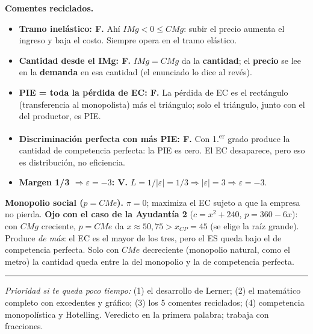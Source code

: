 \documentclass[11pt]{article}
\begin{document}
\textbf{Comentes reciclados.}
\begin{itemize}[leftmargin=*,itemsep=2pt]
\item \textbf{Tramo inelástico: F.} Ahí $IMg < 0 \leq CMg$: subir el precio aumenta el ingreso y baja el costo. Siempre opera en el tramo elástico.
\item \textbf{Cantidad desde el IMg: F.} $IMg = CMg$ da la \textbf{cantidad}; el \textbf{precio} se lee en la \textbf{demanda} en esa cantidad (el enunciado lo dice al revés).
\item \textbf{PIE = toda la pérdida de EC: F.} La pérdida de EC es el rectángulo (transferencia al monopolista) más el triángulo; solo el triángulo, junto con el del productor, es PIE.
\item \textbf{Discriminación perfecta con más PIE: F.} Con 1.\textsuperscript{er} grado produce la cantidad de competencia perfecta: la PIE es cero. El EC desaparece, pero eso es distribución, no eficiencia.
\item \textbf{Margen 1/3 $\Rightarrow \varepsilon = -3$: V.} $L = 1/|\varepsilon| = 1/3 \Rightarrow |\varepsilon| = 3 \Rightarrow \varepsilon = -3$.
\end{itemize}

\textbf{Monopolio social ($p = CMe$).} $\pi = 0$; maximiza el EC sujeto a que la empresa no pierda. \textbf{Ojo con el caso de la Ayudantía 2} ($c = x^{2} + 240$, $p = 360 - 6x$): con $CMg$ creciente, $p = CMe$ da $x \approx 50{,}75 > x_{CP} = 45$ (se elige la raíz grande). Produce \emph{de más}: el EC es el mayor de los tres, pero el ES queda bajo el de competencia perfecta. Solo con $CMe$ decreciente (monopolio natural, como el metro) la cantidad queda entre la del monopolio y la de competencia perfecta.

\medskip
\hrule
\smallskip
{\small\textit{Prioridad si te queda poco tiempo:} (1) el desarrollo de Lerner; (2) el matemático completo con excedentes y gráfico; (3) los 5 comentes reciclados; (4) competencia monopolística y Hotelling. Veredicto en la primera palabra; trabaja con fracciones.}
\end{document}
